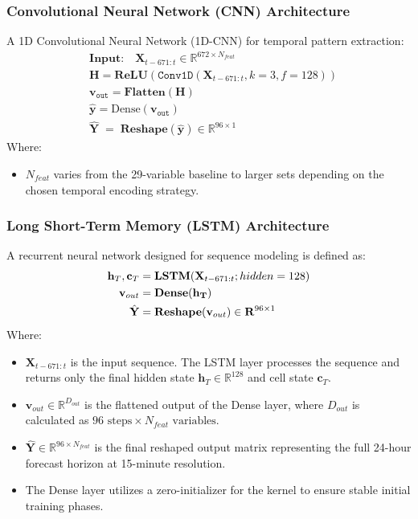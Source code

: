 \documentclass[conference]{IEEEtran}
\begin{document}
	\subsubsection{\textbf{Convolutional Neural Network (CNN) Architecture}}
	A 1D Convolutional Neural Network (1D-CNN) for temporal pattern extraction:
	\begin{equation*} 
		\begin{split}
			&\textbf{Input:} \quad \mathbf{X}_{t-671:t} \in \mathbb{R}^{672 \times N_{feat}} \\
			&\mathbf{H} = \mathbf{ReLU}(\mathtt{Conv1D}(\mathbf{X}_{t-671:t}, k=3, f=128)) \\ 
			&\mathbf{v}_{\mathtt{out}} = \mathbf{Flatten}(\mathbf{H}) \\ 
			&\hat{\mathbf{y}}=\text{Dense}(\mathbf{v}_{\mathtt{out}}) \\
			&\hat{\mathbf{Y}} \;=\; \mathbf{Reshape}(\hat{\mathbf{y}}) \in \mathbb{R}^{96 \times 1}
		\end{split} 
	\end{equation*}
	Where:
	\begin{itemize}
		\item $N_{feat}$ varies from the 29-variable baseline to larger sets depending on the chosen temporal encoding strategy.
	\end{itemize}
	
	\subsubsection{\textbf{Long Short-Term Memory (LSTM) Architecture}}
	A recurrent neural network designed for sequence modeling is defined as:
	\begin{equation*}
		\begin{split}
			\mathbf{h}_T, \mathbf{c}_T &= \mathbf{LSTM}(\mathbf{X}_{t-671:t}; \small hidden=128) \\
			\mathbf{v}_{out} &= \mathbf{Dense(h_{T})} \\
			\hat{\mathbf{Y}} &= \mathbf{Reshape}(\mathbf{v}_{out}) \in \mathbf{R}^{96 \times 1}
		\end{split}
	\end{equation*}
	Where:
	\begin{itemize}
		\item $\mathbf{X}_{t-671:t}$ is the input sequence. The LSTM layer processes the sequence and returns only the final hidden state $\mathbf{h}_T \in \mathbb{R}^{128}$ and cell state $\mathbf{c}_T$.
		\item $\mathbf{v}_{out} \in \mathbb{R}^{D_{out}}$ is the flattened output of the Dense layer, where $D_{out}$ is calculated as $96 \text{ steps} \times N_{feat} \text{ variables}$.
		\item $\hat{\mathbf{Y}} \in \mathbb{R}^{96 \times N_{feat}}$ is the final reshaped output matrix representing the full 24-hour forecast horizon at 15-minute resolution.
		\item The Dense layer utilizes a zero-initializer for the kernel to ensure stable initial training phases.
	\end{itemize}
	
\end{document}
